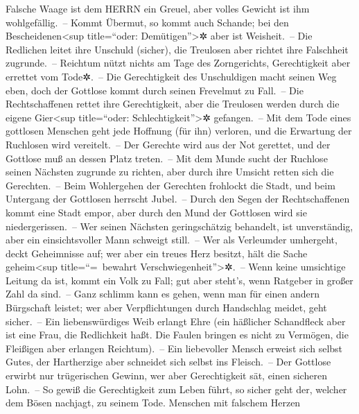 Falsche Waage ist dem HERRN ein Greuel, aber volles
Gewicht ist ihm wohlgefällig.~-- Kommt Übermut, so kommt
auch Schande; bei den Bescheidenen\textless sup title=``oder:
Demütigen''\textgreater✲ aber ist Weisheit.~-- Die
Redlichen leitet ihre Unschuld (sicher), die Treulosen aber richtet ihre
Falschheit zugrunde.~-- Reichtum nützt nichts am Tage des
Zorngerichts, Gerechtigkeit aber errettet vom Tode✲.~--
Die Gerechtigkeit des Unschuldigen macht seinen Weg eben,
doch der Gottlose kommt durch seinen Frevelmut zu Fall.~--
Die Rechtschaffenen rettet ihre Gerechtigkeit, aber die
Treulosen werden durch die eigene Gier\textless sup title=``oder:
Schlechtigkeit''\textgreater✲ gefangen.~-- Mit dem Tode
eines gottlosen Menschen geht jede Hoffnung (für ihn) verloren, und die
Erwartung der Ruchlosen wird vereitelt.~-- Der Gerechte
wird aus der Not gerettet, und der Gottlose muß an dessen Platz
treten.~-- Mit dem Munde sucht der Ruchlose seinen
Nächsten zugrunde zu richten, aber durch ihre Umsicht retten sich die
Gerechten.~-- Beim Wohlergehen der Gerechten frohlockt
die Stadt, und beim Untergang der Gottlosen herrscht Jubel.~--
Durch den Segen der Rechtschaffenen kommt eine Stadt
empor, aber durch den Mund der Gottlosen wird sie niedergerissen.~--
Wer seinen Nächsten geringschätzig behandelt, ist
unverständig, aber ein einsichtsvoller Mann schweigt still.~--
Wer als Verleumder umhergeht, deckt Geheimnisse auf; wer
aber ein treues Herz besitzt, hält die Sache geheim\textless sup
title=``=~bewahrt Verschwiegenheit''\textgreater✲.~--
Wenn keine umsichtige Leitung da ist, kommt ein Volk zu
Fall; gut aber steht's, wenn Ratgeber in großer Zahl da sind.~--
Ganz schlimm kann es gehen, wenn man für einen andern
Bürgschaft leistet; wer aber Verpflichtungen durch Handschlag meidet,
geht sicher.~-- Ein liebenswürdiges Weib erlangt Ehre
(ein häßlicher Schandfleck aber ist eine Frau, die Redlichkeit haßt. Die
Faulen bringen es nicht zu Vermögen, die Fleißigen aber erlangen
Reichtum).~-- Ein liebevoller Mensch erweist sich selbst
Gutes, der Hartherzige aber schneidet sich selbst ins Fleisch.~--
Der Gottlose erwirbt nur trügerischen Gewinn, wer aber
Gerechtigkeit sät, einen sicheren Lohn.~-- So gewiß die
Gerechtigkeit zum Leben führt, so sicher geht der, welcher dem Bösen
nachjagt, zu seinem Tode. Menschen mit falschem Herzen
